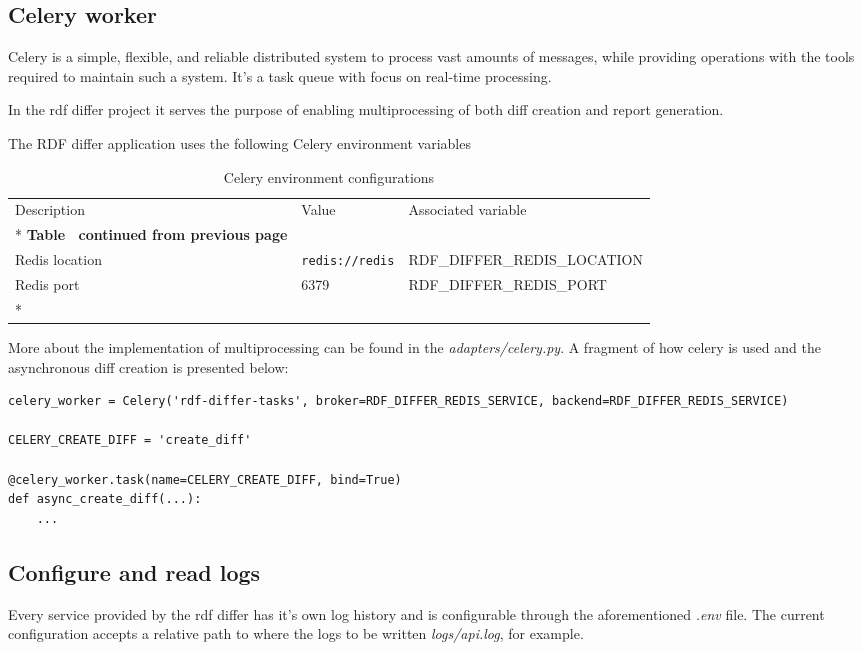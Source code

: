 \subsection{Celery worker}
Celery is a simple, flexible, and reliable distributed system to process vast amounts of messages, while providing operations with the tools required to maintain such a system. It’s a task queue with focus on real-time processing.

In the rdf differ project it serves the purpose of enabling multiprocessing of both diff creation and report generation.

The RDF differ application uses the following Celery environment variables

\begin{longtable}[c]{@{}p{3.5cm}p{3.5cm}l@{}}
	\toprule
	Description    & Value                  & Associated variable          \\* \midrule
	\endfirsthead
	\multicolumn{3}{c}%
	{{\bfseries Table \thetable\ continued from previous page}}            \\
	\endhead
	\bottomrule
	\endfoot
	\endlastfoot
	Redis location & \texttt{redis://redis} & RDF\_DIFFER\_REDIS\_LOCATION \\
	Redis port     & 6379                   & RDF\_DIFFER\_REDIS\_PORT     \\*\bottomrule
	\caption{Celery environment configurations}
	\label{tab:celery-env}                                                  \\
\end{longtable}

More about the implementation of multiprocessing can be found in the \textit{adapters/celery.py}. A fragment of how celery is used and the asynchronous diff creation is presented below:

\begin{lstlisting}
celery_worker = Celery('rdf-differ-tasks', broker=RDF_DIFFER_REDIS_SERVICE, backend=RDF_DIFFER_REDIS_SERVICE)

CELERY_CREATE_DIFF = 'create_diff'

@celery_worker.task(name=CELERY_CREATE_DIFF, bind=True)
def async_create_diff(...):
	...
\end{lstlisting}

\subsection{Configure and read logs}
Every service provided by the rdf differ has it's own log history and is configurable through the aforementioned \textit{.env} file. The current configuration accepts a relative path to where the logs to be written \textit{logs/api.log}, for example.

